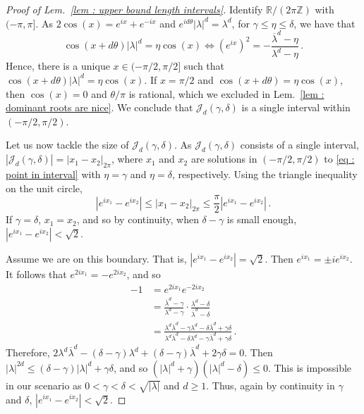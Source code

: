 \documentclass[a4paper,UKenglish,cleveref, autoref, thm-restate]{lipics-v2021}
\begin{document}
\begin{proof}[Proof of Lem.~\ref{lem : upper bound length intervals}]
    Identify $\mathbb{R}/(2\pi\mathbb{Z})$ with $(-\pi,\pi]$.
    As $2\cos(x) = e^{ix} +e^{-ix}$ and $e^{id\theta}|\lambda|^d = \lambda^d$, for $\gamma \le \eta \le \delta$, we have that
    \begin{equation}\label{eq : point in interval}
      \cos(x + d\theta)|\lambda|^d = \eta \cos(x) \Longleftrightarrow
      \left(e^{ix}\right)^2 =
      -\frac{\overline{\lambda}^d-\eta}{\lambda^d-\eta} \, .
    \end{equation}
    Hence, there is a unique $x \in (-\pi/2, \pi/2]$ such that
    $\cos(x + d\theta)|\lambda|^d = \eta \cos(x)$.
    If $x = \pi/2$ and $\cos(x+d\theta) = \eta \cos(x)$, then $\cos(x)
    = 0$ and $\theta/\pi$ is rational, which we excluded in Lem.~\ref{lem : dominant roots are nice}. 
    We conclude that $\mathcal{J}_d(\gamma, \delta)$ is a single interval within $(-\pi/2, \pi/2)$.

    Let us now tackle the size of $\mathcal{J}_d(\gamma, \delta)$.
    As $\mathcal{J}_d(\gamma, \delta)$ consists of a single interval, $|\mathcal{J}_d(\gamma,\delta)| = |x_1 - x_2|_{2\pi}$, where $x_1$ and $x_2$ are solutions in $(-\pi/2,\pi/2)$ to \eqref{eq : point in interval} with $\eta = \gamma$ and $\eta = \delta$, respectively. 
    Using the triangle inequality on the unit circle, 
    \begin{equation*}
        |e^{ix_1} - e^{ix_2}| \le |x_1-x_2|_{2\pi} \le
        \frac{\pi}{2}|e^{ix_1} - e^{ix_2}| \, .
    \end{equation*}
    If $\gamma = \delta$, $x_1 = x_2$, and so by continuity, when $\delta - \gamma$ is small enough, $|e^{ix_1} - e^{ix_2}| < \sqrt{2}$.
    
    Assume we are on this boundary. 
    That is, $|e^{ix_1} - e^{ix_2}| = \sqrt{2}$.
    Then $e^{ix_1} =\pm i e^{ix_2}$.
    It follows that $e^{2ix_1} = -e^{2ix_2}$, and so
    \begin{align*}
      -1 &= e^{2ix_1}e^{-2ix_2} \\
       &= \frac{\overline{\lambda}^d-\gamma}{\lambda^d-\gamma}\cdot \frac{\lambda^d-\delta}{\overline{\lambda}^d-\delta}\\
        &=\frac{\lambda^d\overline{\lambda}^d -\gamma \lambda^d -\delta \overline{\lambda}^d +\gamma\delta}{\lambda^d\overline{\lambda}^d - \delta \lambda^d -\gamma \overline{\lambda}^d +\gamma\delta} \, .
    \end{align*}
    Therefore, $2\lambda^d\overline{\lambda}^d -(\delta-\gamma) \lambda^d
       +(\delta-\gamma) \overline{\lambda}^d +2\gamma\delta = 0. $
    Then $|\lambda|^{2d} \le (\delta - \gamma)|\lambda|^d + \gamma\delta$, and so $(|\lambda|^d + \gamma)(|\lambda|^d - \delta) \le 0$. 
    This is impossible in our scenario as $0 < \gamma < \delta < \sqrt{|\lambda|}$ and $d \ge 1$.
    Thus, again by continuity in $\gamma$ and $\delta$, $|e^{ix_1} - e^{ix_2}| < \sqrt{2}$.
    

\end{proof}
\end{document}
